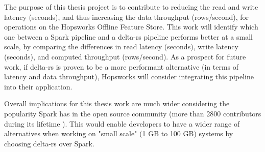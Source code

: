 The purpose of this thesis project is to contribute to reducing the read and write latency (seconds), and thus increasing the data throughput (rows/second), for operations on the Hopsworks Offline Feature Store. This work will identify which one between a Spark pipeline and a delta-rs pipeline performs better at a small scale, by comparing the differences in read latency (seconds), write latency (seconds), and computed throughput (rows/second). As a prospect for future work, if delta-rs is proven to be a more performant alternative (in terms of latency and data throughput), Hopsworks will consider integrating this pipeline into their application.

Overall implications for this thesis work are much wider considering the popularity Spark has in the open source community (more than 2800 contributors during its lifetime \cite{ApacheSparkOpen}). This would enable developers to have a wider range of alternatives when working on "small scale" (1 GB to 100 GB) systems by choosing delta-rs over Spark.